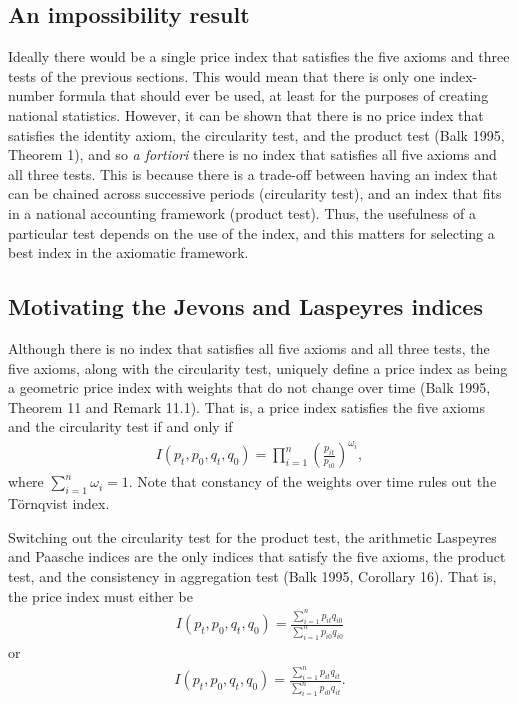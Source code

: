 \documentclass[
]{article}
\begin{document}
\hypertarget{an-impossibility-result}{%
\subsection{An impossibility result}\label{an-impossibility-result}}

Ideally there would be a single price index that satisfies the five axioms and three tests of the previous sections. This would mean that there is only one index-number formula that should ever be used, at least for the purposes of creating national statistics. However, it can be shown that there is no price index that satisfies the identity axiom, the circularity test, and the product test (Balk 1995, Theorem 1), and so \emph{a fortiori} there is no index that satisfies all five axioms and all three tests. This is because there is a trade-off between having an index that can be chained across successive periods (circularity test), and an index that fits in a national accounting framework (product test). Thus, the usefulness of a particular test depends on the use of the index, and this matters for selecting a best index in the axiomatic framework.

\hypertarget{motivating-the-jevons-and-laspeyres-indices}{%
\subsection{Motivating the Jevons and Laspeyres indices}\label{motivating-the-jevons-and-laspeyres-indices}}

Although there is no index that satisfies all five axioms and all three tests, the five axioms, along with the circularity test, uniquely define a price index as being a geometric price index with weights that do not change over time (Balk 1995, Theorem 11 and Remark 11.1). That is, a price index satisfies the five axioms and the circularity test if and only if
\begin{align*}
I(p_{t}, p_{0}, q_{t}, q_{0}) = \prod_{i = 1}^{n} \left(\frac{p_{it}}{p_{i0}}\right)^{\omega_{i}},
\end{align*}
where \(\sum_{i = 1}^{n} \omega_{i} = 1\). Note that constancy of the weights over time rules out the Törnqvist index.

Switching out the circularity test for the product test, the arithmetic Laspeyres and Paasche indices are the only indices that satisfy the five axioms, the product test, and the consistency in aggregation test (Balk 1995, Corollary 16). That is, the price index must either be
\begin{align*}
I(p_{t}, p_{0}, q_{t}, q_{0}) = \frac{\sum_{i = 1}^{n} p_{it}q_{i0}}{\sum_{i = 1}^{n} p_{i0}q_{i0}}
\end{align*}
or
\begin{align*}
I(p_{t}, p_{0}, q_{t}, q_{0}) = \frac{\sum_{i = 1}^{n} p_{it}q_{it}}{\sum_{i = 1}^{n} p_{i0}q_{it}}.
\end{align*}
\end{document}
